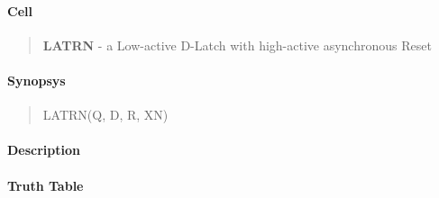 \label{LATRN}
\paragraph{Cell}
\begin{quote}
    \textbf{LATRN} - a Low-active D-Latch with high-active asynchronous Reset
\end{quote}

\paragraph{Synopsys}
\begin{quote}
    LATRN(Q, D, R, XN)
\end{quote}

\paragraph{Description}

%

\paragraph{Truth Table}
%

